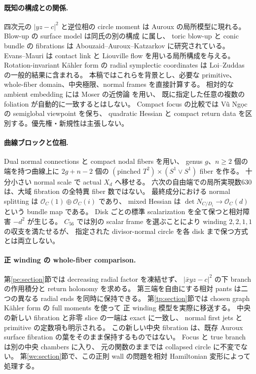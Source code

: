 \documentclass[11pt,a4paper]{article}
\theoremstyle{definition}
\begin{document}
\paragraph{既知の構成との関係.}
四次元の $|yz-c|^2$ と逆位相の circle moment は
Auroux \cite[\S5.1]{auroux-local} の局所模型に現れる。
Blow-up の surface model は同氏の別の構成 \cite[\S3.1.2]{auroux-blowup} に属し、
toric blow-up と conic bundle の fibrations は Abouzaid--Auroux--Katzarkov \cite{aak} に研究されている。
Evans--Mauri \cite{em} は contact link と Liouville flow を用いる局所構成を与える。
Rotation-invariant Kähler form の radial symplectic coordinates は
Loi--Zuddas \cite[Theorem 1.1]{loi-zuddas-local} の一般的結果に含まれる。
本稿ではこれらを背景とし、必要な primitive、whole-fiber domain、中央極限、normal frames を直接計算する。
相対的な ambient embedding には Moser の近傍論 \cite[\S7.3]{cds-local} を用い、
既に指定した任意の複数の foliation が自動的に一致するとはしない。
Compact focus の比較では V\~u Ng\d{o}c \cite{vungoc-local} の semiglobal viewpoint を保ち、
quadratic Hessian と compact return data を区別する。優先権・新規性は主張しない。

\paragraph{曲線ブロックと位相.}
Dual normal connections と compact nodal fibers を用い、
genus $g$、$n\ge2$ 個の端を持つ曲線上に
$2g+n-2$ 個の $(\text{pinched }T^2)\times(S^1\vee S^1)$ fiber を作る。
十分小さい normal scale で actual $X_d$ へ移せる。
六次の自由端での局所実現数630は、大域 fibration の全特異 fiber 数ではない。
最終成分における normal splitting は
$\mathcal O_C(1)\oplus\mathcal O_C(i)$ であり、
mixed Hessian は $\det N_{C/D_i}\to\mathcal O_C(d)$ という bundle map である。
Disk ごとの標準 scalarization を全て保つと相対障害 $-d^2$ が生じる。
$C_{56}$ では別の scalar frame を選ぶことにより winding $2,2,1,1$ の収支を満たせるが、
指定された divisor-normal circle を各 disk まで保つ方式とは両立しない。

\paragraph{正 winding の whole-fiber comparison.}
第\ref{pe:section}節では decreasing radial factor を凍結せず、
$|\bar xyz-c|^2$ の下 branch の作用積分と return holonomy を求める。
第三端を自由にする相対 pants は二つの異なる radial ends を同時に保持できる。
第\ref{tp:section}節では chosen graph Kähler form の full moments を使って
正 winding 模型を実際に移送する。
中央の新しい fibration と非零 slice の一端は exact に一致し、
normal first jets と primitive の定数項も明示される。
この新しい中央 fibration は、既存 Auroux surface fibration の葉をそのまま保持するものではない。
Focus と true branch は別の中央 chambers に入り、
元の関数のままでは collapsed circle に不変でない。
第\ref{we:section}節で、この正則 wall の問題を相対 Hamiltonian 変形によって処理する。
\end{document}
